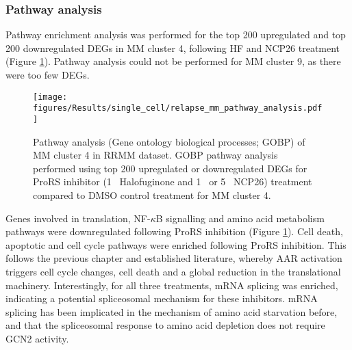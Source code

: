 \subsubsection{Pathway analysis}
Pathway enrichment analysis was performed for the top 200 upregulated and top 200 downregulated DEGs in MM cluster 4, following HF and NCP26 treatment (Figure \ref{fig:relapse_mm_pathway_analysis}).
Pathway analysis could not be performed for MM cluster 9, as there were too few DEGs.
\begin{figure}[htb]
\centering
\texttt{[image: figures/Results/single\_cell/relapse\_mm\_pathway\_analysis.pdf]}
\caption[MM cluster pathway analysis- relapsed MM]{Pathway analysis (Gene ontology biological processes; GOBP) of MM cluster 4 in RRMM dataset.
GOBP pathway analysis performed using top 200 upregulated or downregulated DEGs for ProRS inhibitor (1\si{\micro\Molar} Halofuginone and 1\si{\micro\Molar} or 5\si{\micro\Molar}  NCP26) treatment compared to DMSO control treatment for MM cluster 4.
}
\label{fig:relapse_mm_pathway_analysis}
\end{figure}
Genes involved in translation, NF-$\kappa$B signalling and amino acid metabolism pathways were downregulated following ProRS inhibition (Figure \ref{fig:relapse_mm_pathway_analysis}).
Cell death, apoptotic and cell cycle pathways were enriched following ProRS inhibition.
This follows the previous chapter and established literature, whereby AAR activation triggers cell cycle changes, cell death and a global reduction in the translational machinery.
Interestingly, for all three treatments, mRNA splicing was enriched, indicating a potential spliceosomal mechanism for these inhibitors.
mRNA splicing has been implicated in the mechanism of amino acid starvation before\cite{deval2009amino}, and that the spliceosomal response to amino acid depletion does not require GCN2 activity.

